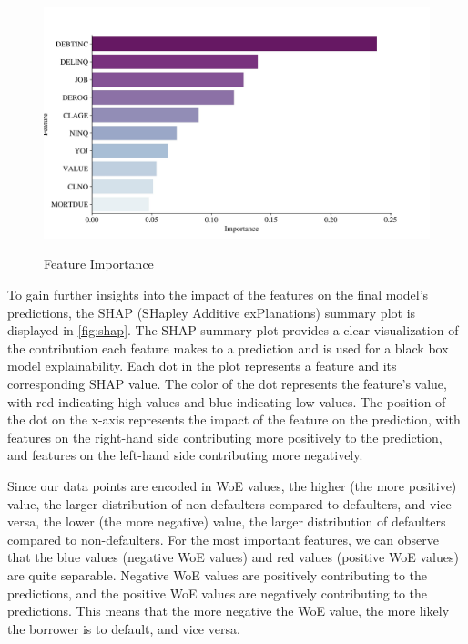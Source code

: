 \begin{figure}[H]
    \centering
    \caption{Feature Importance}\vspace{0.5em}
    \label{fig:fi}\
    \includegraphics[width=140mm]{Figures/Feature_Importances.jpg}
    \vspace{-1em}
\end{figure}

To gain further insights into the impact of the features on the final model's predictions, the SHAP (SHapley Additive exPlanations) summary plot is displayed in \autoref{fig:shap}.
The SHAP summary plot provides a clear visualization of the contribution each feature makes to a prediction and is used for a black box model explainability.
Each dot in the plot represents a feature and its corresponding SHAP value.
The color of the dot represents the feature's value, with red indicating high values and blue indicating low values.
The position of the dot on the x-axis represents the impact of the feature on the prediction, with features on the right-hand side contributing more positively to the prediction, and features on the left-hand side contributing more negatively.

Since our data points are encoded in WoE values, the higher (the more positive) value, the larger distribution of non-defaulters compared to defaulters, and vice versa, the lower (the more negative) value, the larger distribution of defaulters compared to non-defaulters.
For the most important features, we can observe that the blue values (negative WoE values) and red values (positive WoE values) are quite separable.
Negative WoE values are positively contributing to the predictions, and the positive WoE values are negatively contributing to the predictions. This means that the more negative the WoE value, the more likely the borrower is to default, and vice versa.

